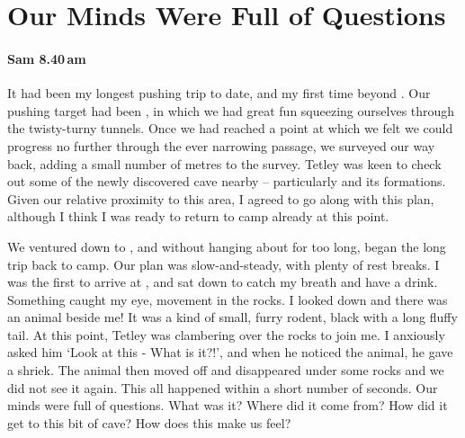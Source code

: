 \section{Our Minds Were Full of Questions}
\label{sec:creature}

\paragraph{Sam 8.40\,am}

It had been my longest pushing trip to date, and my first time beyond . Our pushing target had been , in which we had great fun squeezing ourselves through the twisty-turny tunnels. Once we had reached a point at which we felt we could progress no further through the ever narrowing passage, we surveyed our way back, adding a small number of metres to the survey. Tetley was keen to check out some of the newly discovered cave nearby – particularly  and its formations. Given our relative proximity to this area, I agreed to go along with this plan, although I think I was ready to return to camp already at this point.


We ventured down to , and without hanging about for too long, began the long trip back to camp. Our plan was slow-and-steady, with plenty of rest breaks. I was the first to arrive at , and sat down to catch my breath and have a drink. Something caught my eye, movement in the rocks. I looked down and there was an animal beside me! It was a kind of small, furry rodent, black with a long fluffy tail. At this point, Tetley was clambering over the rocks to join me. I anxiously asked him `Look at this - What is it?!', and when he noticed the animal, he gave a shriek. The animal then moved off and disappeared under some rocks and we did not see it again. This all happened within a short number of seconds. Our minds were full of questions. What was it? Where did it come from? How did it get to this bit of cave? How does this make us feel? 


